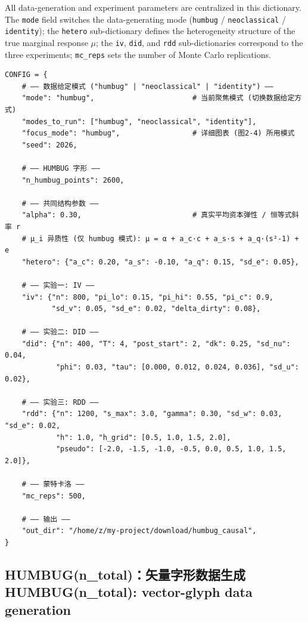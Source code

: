 \documentclass[12pt,a4paper]{ctexart}
\begin{document}
All data-generation and experiment parameters are centralized in this dictionary. The \texttt{mode} field switches the data-generating mode (\texttt{humbug} / \texttt{neoclassical} / \texttt{identity}); the \texttt{hetero} sub-dictionary defines the heterogeneity structure of the true marginal response $\mu$; the \texttt{iv}, \texttt{did}, and \texttt{rdd} sub-dictionaries correspond to the three experiments; \texttt{mc\_reps} sets the number of Monte Carlo replications.

\begin{lstlisting}[style=pycode]
CONFIG = {
    # —— 数据给定模式 ("humbug" | "neoclassical" | "identity") ——
    "mode": "humbug",                       # 当前聚焦模式 (切换数据给定方式)
    "modes_to_run": ["humbug", "neoclassical", "identity"],
    "focus_mode": "humbug",                 # 详细图表 (图2-4) 所用模式
    "seed": 2026,

    # —— HUMBUG 字形 ——
    "n_humbug_points": 2600,

    # —— 共同结构参数 ——
    "alpha": 0.30,                          # 真实平均资本弹性 / 恒等式斜率 r
    # μ_i 异质性 (仅 humbug 模式): μ = α + a_c·c + a_s·s + a_q·(s²-1) + e
    "hetero": {"a_c": 0.20, "a_s": -0.10, "a_q": 0.15, "sd_e": 0.05},

    # —— 实验一: IV ——
    "iv": {"n": 800, "pi_lo": 0.15, "pi_hi": 0.55, "pi_c": 0.9,
           "sd_v": 0.05, "sd_e": 0.02, "delta_dirty": 0.08},

    # —— 实验二: DID ——
    "did": {"n": 400, "T": 4, "post_start": 2, "dk": 0.25, "sd_nu": 0.04,
            "phi": 0.03, "tau": [0.000, 0.012, 0.024, 0.036], "sd_u": 0.02},

    # —— 实验三: RDD ——
    "rdd": {"n": 1200, "s_max": 3.0, "gamma": 0.30, "sd_w": 0.03, "sd_e": 0.02,
            "h": 1.0, "h_grid": [0.5, 1.0, 1.5, 2.0],
            "pseudo": [-2.0, -1.5, -1.0, -0.5, 0.0, 0.5, 1.0, 1.5, 2.0]},

    # —— 蒙特卡洛 ——
    "mc_reps": 500,

    # —— 输出 ——
    "out_dir": "/home/z/my-project/download/humbug_causal",
}
\end{lstlisting}

\subsection[HUMBUG]{HUMBUG(n\_total)：矢量字形数据生成\\[1pt]\normalsize HUMBUG(n\_total): vector-glyph data generation}
\end{document}
